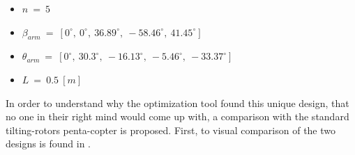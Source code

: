 {\small\begin{itemize}
  \item $n\ =\ 5$
  \item $\beta_{arm}\ =\ [0^{\circ},\  0^{\circ},\  36.89^{\circ},\  -58.46^{\circ},\   41.45^{\circ}]$
  \item $\theta_{arm}\ =\ [0^{\circ},\  30.3^{\circ},\  -16.13^{\circ},\  -5.46^{\circ},\  -33.37^{\circ}]$
  \item $L\ =\ 0.5\ [m]$
\end{itemize}}

In order to understand why the optimization tool found this unique design,
that no one in their right mind would come up with, a comparison with the
standard tilting-rotors penta-copter is proposed. First, to  visual comparison of the
two designs is found in .


